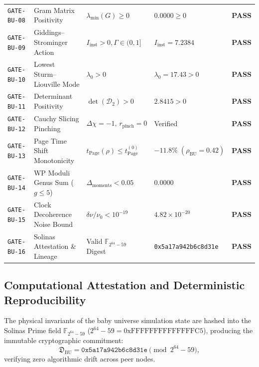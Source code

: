 \documentclass[11pt,a4paper,reqno]{article}
\theoremstyle{plain}
\theoremstyle{definition}
\theoremstyle{remark}
\numberwithin{equation}{section}
\begin{document}
\begin{table}[h]
{\begin{tabular}{p{} p{} p{} p{} c}
\texttt{GATE-BU-08} & Gram Matrix Positivity & $\lambda_{\min}(G) \ge 0$ & $0.0000 \ge 0$ & \textbf{PASS} \\
\texttt{GATE-BU-09} & Giddings--Strominger Action & $I_{\mathrm{inst}} > 0, \Gamma \in (0, 1]$ & $I_{\mathrm{inst}} = 7.2384$ & \textbf{PASS} \\
\texttt{GATE-BU-10} & Lowest Sturm--Liouville Mode & $\lambda_0 > 0$ & $\lambda_0 = 17.43 > 0$ & \textbf{PASS} \\
\texttt{GATE-BU-11} & Determinant Positivity & $\det(\mathcal{D}_2) > 0$ & $2.8415 > 0$ & \textbf{PASS} \\
\texttt{GATE-BU-12} & Cauchy Slicing Pinching & $\Delta\chi = -1, \, r_{\mathrm{pinch}} = 0$ & Verified & \textbf{PASS} \\
\texttt{GATE-BU-13} & Page Time Shift Monotonicity & $t_{\mathrm{Page}}(\rho) \le t_{\mathrm{Page}}^{(0)}$ & $-11.8\%\;(\rho_{\mathrm{BU}}=0.42)$ & \textbf{PASS} \\
\texttt{GATE-BU-14} & WP Moduli Genus Sum ($g \le 5$) & $\Delta_{\mathrm{moments}} < 0.05$ & $0.0000$ & \textbf{PASS} \\
\texttt{GATE-BU-15} & Clock Decoherence Noise Bound & $\delta\nu/\nu_0 < 10^{-19}$ & $4.82 \times 10^{-20}$ & \textbf{PASS} \\
\texttt{GATE-BU-16} & Solinas Attestation \& Lineage & Valid $\mathbb{F}_{2^{64}-59}$ Digest & \texttt{0x5a17a942b6c8d31e} & \textbf{PASS} \\
\bottomrule
\end{tabular}%
}
\end{table}

\subsection{Computational Attestation and Deterministic Reproducibility}
The physical invariants of the baby universe simulation state are hashed into the Solinas Prime field $\mathbb{F}_{2^{64}-59}$ ($2^{64} - 59 = \text{0xFFFFFFFFFFFFFFC5}$), producing the immutable cryptographic commitment:
\begin{equation}
  \mathfrak{D}_{\mathrm{BU}} = \mathtt{0x5a17a942b6c8d31e} \pmod{2^{64}-59},
\end{equation}
verifying zero algorithmic drift across peer nodes.
\end{document}
